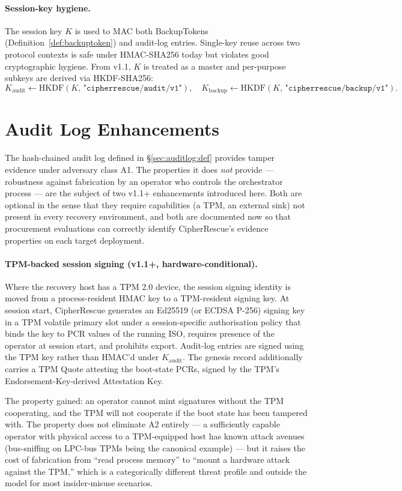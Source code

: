 \documentclass[11pt,a4paper]{report}
\begin{document}
\paragraph{Session-key hygiene.} The session key $K$ is used to MAC both BackupTokens (Definition~\ref{def:backuptoken}) and audit-log entries. Single-key reuse across two protocol contexts is safe under HMAC-SHA256 today but violates good cryptographic hygiene. From v1.1, $K$ is treated as a master and per-purpose subkeys are derived via HKDF-SHA256:
\[
  K_{\mathrm{audit}} \leftarrow \mathrm{HKDF}(K,\, \texttt{"cipherrescue/audit/v1"}), \quad
  K_{\mathrm{backup}} \leftarrow \mathrm{HKDF}(K,\, \texttt{"cipherrescue/backup/v1"}).
\]

\section{Audit Log Enhancements}
\label{sec:audit:enhancements}

The hash-chained audit log defined in \S\ref{sec:auditlog:def} provides tamper evidence under adversary class A1. The properties it does \emph{not} provide --- robustness against fabrication by an operator who controls the orchestrator process --- are the subject of two v1.1+ enhancements introduced here. Both are optional in the sense that they require capabilities (a TPM, an external sink) not present in every recovery environment, and both are documented now so that procurement evaluations can correctly identify CipherRescue's evidence properties on each target deployment.

\paragraph{TPM-backed session signing (v1.1+, hardware-conditional).}
Where the recovery host has a TPM 2.0 device, the session signing identity is moved from a process-resident HMAC key to a TPM-resident signing key. At session start, CipherRescue generates an Ed25519 (or ECDSA P-256) signing key in a TPM volatile primary slot under a session-specific authorisation policy that binds the key to PCR values of the running ISO, requires presence of the operator at session start, and prohibits export. Audit-log entries are signed using the TPM key rather than HMAC'd under $K_{\mathrm{audit}}$. The genesis record additionally carries a TPM Quote attesting the boot-state PCRs, signed by the TPM's Endorsement-Key-derived Attestation Key.

The property gained: an operator cannot mint signatures without the TPM cooperating, and the TPM will not cooperate if the boot state has been tampered with. The property does not eliminate A2 entirely --- a sufficiently capable operator with physical access to a TPM-equipped host has known attack avenues (bus-sniffing on LPC-bus TPMs being the canonical example) --- but it raises the cost of fabrication from ``read process memory'' to ``mount a hardware attack against the TPM,'' which is a categorically different threat profile and outside the model for most insider-misuse scenarios.
\end{document}
